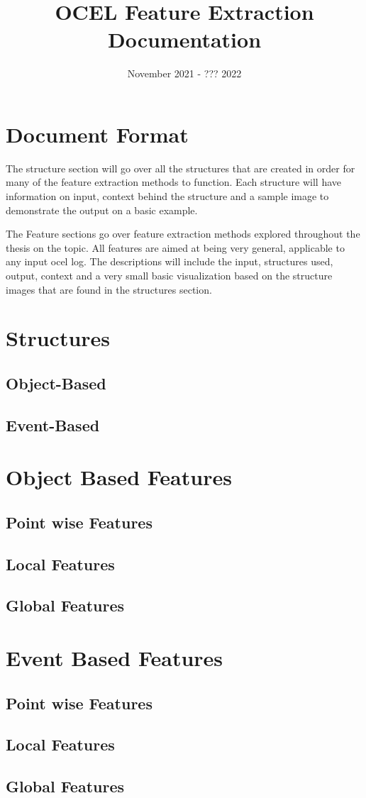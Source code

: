 \documentclass{article}
\title{OCEL Feature Extraction Documentation}
\date{November 2021 - ??? 2022}
\begin{document}
\maketitle

\tableofcontents
\pagebreak

\section{Document Format}
The structure section will go over all the structures that are created in order for many of the feature extraction methods to function. Each structure will have information on input, context behind the structure and a sample image to demonstrate the output on a basic example.

The Feature sections go over feature extraction methods explored throughout the thesis on the topic. All features are aimed at being very general, applicable to any input ocel log. The descriptions will include the input, structures used, output, context and a very small basic visualization based on the structure images that are found in the structures section. 

\section{Structures}
\subsection{Object-Based}
\subsection{Event-Based}
\section{Object Based Features}
\subsection{Point wise Features}
\subsection{Local Features}
\subsection{Global Features}
\section{Event Based Features}
\subsection{Point wise Features}
\subsection{Local Features}
\subsection{Global Features}
\end{document}
